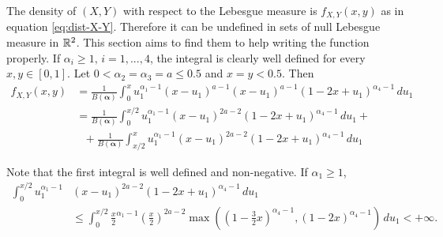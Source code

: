 The density of $(X,Y)$ with respect to the Lebesgue measure is $f_{X,Y}(x,y)$
as in equation \eqref{eq:dist-X-Y}. Therefore it can be undefined in sets of
null Lebesgue measure in $\mathbb{R}^2$. This section
aims to find them to help writing the function properly. If $\alpha_i \ge 1,
\, i = 1,...,4$, the integral is clearly well defined for every $x,y \in [0,1]$. Let $0 < \alpha_2 = \alpha_3 = a \le 0.5$ and $x = y < 0.5$. Then
\begin{equation*}
  \begin{split}
    f_{X,Y}(x,y) &= \frac{1}{B(\boldsymbol{\alpha})}\int_{0}^x u_1^{\alpha_1-1}(x-u_1)^{a-1}(x-u_1)^{a-1}(1-2x+u_1)^{\alpha_4-1} \, du_1 \\
    &= \frac{1}{B(\boldsymbol{\alpha})}\int_{0}^{x/2} u_1^{\alpha_1-1}(x-u_1)^{2a-2}(1-2x+u_1)^{\alpha_4-1} \, du_1 + \\
    &~~~+ \frac{1}{B(\boldsymbol{\alpha})}\int_{x/2}^x u_1^{\alpha_1-1}(x-u_1)^{2a-2}(1-2x+u_1)^{\alpha_4-1} \, du_1
  \end{split}
\end{equation*}

Note that the first integral is well defined and non-negative. If $\alpha_1 \ge 1$, 
\begin{equation*}
  \begin{split}
    \int_{0}^{x/2} u_1^{\alpha_1-1}&(x-u_1)^{2a-2}(1-2x+u_1)^{\alpha_4-1} \, du_1 \\
    &\le \int_{0}^{x/2} \frac{x}{2}^{\alpha_1-1}\left(\frac{x}{2}\right)^{2a-2}\max\left(\left(1-\frac{3}{2}x\right)^{\alpha_4-1}, (1-2x)^{\alpha_4-1}\right) \, du_1 < +\infty.
  \end{split}
\end{equation*}

